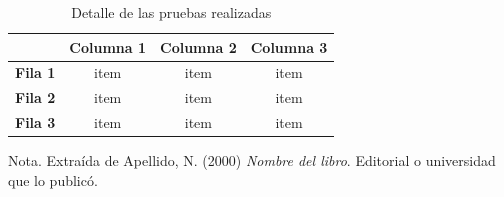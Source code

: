 \begin{table}[H]
    \caption{Detalle de las pruebas realizadas}
    \label{tabla:ejemplo}
    \begin{center}
        \begin{tabular}{c|c|c|c|}
            \cline{2-4}
            & \textbf{Columna 1} & \textbf{Columna 2} & \textbf{Columna 3} \\ \hline
            \multicolumn{1}{|c|}{\textbf{Fila 1}} & item               & item               & item               \\ \hline
            \multicolumn{1}{|c|}{\textbf{Fila 2}} & item               & item               & item               \\ \hline
            \multicolumn{1}{|c|}{\textbf{Fila 3}} & item               & item               & item               \\ \hline
        \end{tabular}
    \end{center}
    Nota. Extraída de Apellido, N. (2000) \textit{Nombre del libro}.
    Editorial o universidad que lo publicó.
\end{table}

